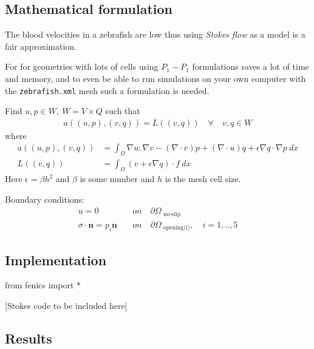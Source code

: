 \documentclass[epsfig,11pt]{article}
\begin{document}
\subsection{Mathematical formulation}

The blood velocities in a zebrafish are low thus using \emph{Stokes flow} as a model is a fair approximation.

For for geometries with lots of cells using $P_1-P_1$ formulations saves a lot of time and memory, and to even be able to run simulations on your own computer with the \texttt{zebrafish.xml} mesh such a formulation is needed. 

Find $u,p \in W,\: W = V \times Q $ such that
\begin{align*}
a((u,p),(v,q)) = L((v,q)) \quad \forall \quad v,q \in W 
\end{align*}
where
\begin{align*}
a((u,p),(v,q)) &= \int_\Omega \nabla u : \nabla v - (\nabla \cdot v)p + (\nabla \cdot u)q + \epsilon \nabla q \cdot \nabla p \: dx \\
L((v,q)) &= \int_\Omega  (v + \epsilon \nabla q) \cdot f \: dx
\end{align*}
Here \(\epsilon = \beta h^2\) and \(\beta\) is some number and \(h\) is the mesh cell size.

Boundary conditions:
\begin{align*}
u = 0 \quad &on \quad \partial \Omega_{\text{ no-slip}} \\
\sigma \cdot \mathbf{n} = p_i\mathbf{n} \quad &on \quad \partial \Omega_\text{ opening(i)},\quad i=1,..,5
\end{align*}

\subsection{Implementation}

\begin{python}
from fenics import *

[Stokes code to be included here]
\end{python}


\subsection{Results}
\end{document}
